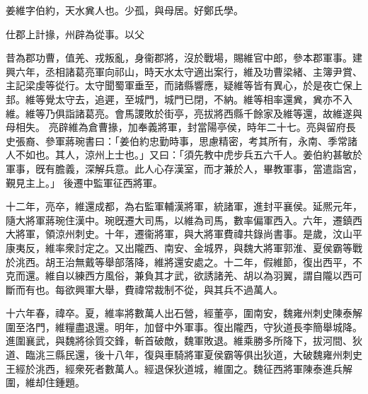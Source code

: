 \begin{pinyinscope}
 
 
 姜維字伯約，天水兾人也。少孤，與母居。好鄭氏學。
 
 
 仕郡上計掾，州辟為從事。以父
 
 
 昔為郡功曹，值羌、戎叛亂，身衞郡將，沒於戰場，賜維官中郎，參本郡軍事。建興六年，丞相諸葛亮軍向祁山，時天水太守適出案行，維及功曹梁緒、主簿尹賞、主記梁虔等從行。太守聞蜀軍垂至，而諸縣響應，疑維等皆有異心，於是夜亡保上邽。維等覺太守去，追遲，至城門，城門已閉，不納。維等相率還兾，兾亦不入維。維等乃俱詣諸葛亮。會馬謖敗於街亭，亮拔將西縣千餘家及維等還，故維遂與母相失。
 亮辟維為倉曹掾，加奉義將軍，封當陽亭侯，時年二十七。亮與留府長史張裔、參軍蔣琬書曰：「姜伯約忠勤時事，思慮精密，考其所有，永南、季常諸人不如也。其人，涼州上士也。」又曰：「須先教中虎步兵五六千人。姜伯約甚敏於軍事，旣有膽義，深解兵意。此人心存漢室，而才兼於人，畢教軍事，當遣詣宮，覲見主上。」
 後遷中監軍征西將軍。
 
 
十二年，亮卒，維還成都，為右監軍輔漢將軍，統諸軍，進封平襄侯。延熈元年，隨大將軍蔣琬住漢中。琬旣遷大司馬，以維為司馬，數率偏軍西入。六年，遷鎮西大將軍，領涼州刺史。十年，遷衞將軍，與大將軍費禕共錄尚書事。是歲，汶山平康夷反，維率衆討定之。又出隴西、南安、金城界，與魏大將軍郭淮、夏侯霸等戰於洮西。胡王治無戴等舉部落降，維將還安處之。十二年，假維節，復出西平，不克而還。維自以練西方風俗，兼負其才武，欲誘諸羌、胡以為羽翼，謂自隴以西可斷而有也。每欲興軍大舉，費禕常裁制不從，與其兵不過萬人。
 
 
 
 
 十六年春，禕卒。夏，維率將數萬人出石營，經董亭，圍南安，魏雍州刺史陳泰解圍至洛門，維糧盡退還。明年，加督中外軍事。復出隴西，守狄道長李簡舉城降。進圍襄武，與魏將徐質交鋒，斬首破敵，魏軍敗退。維乘勝多所降下，拔河間、狄道、臨洮三縣民還，後十八年，復與車騎將軍夏侯霸等俱出狄道，大破魏雍州刺史王經於洮西，經衆死者數萬人。經退保狄道城，維圍之。魏征西將軍陳泰進兵解圍，維却住鍾題。
 

\end{pinyinscope}
